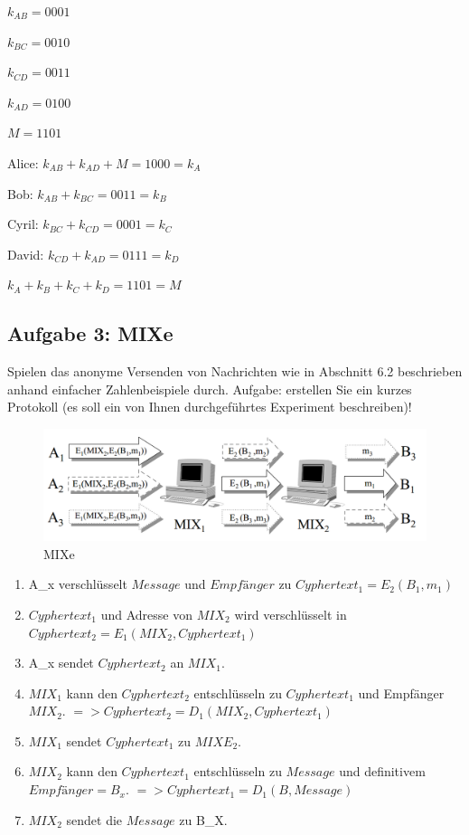\documentclass[11pt]{article}
\makeatletter
\def\maxwidth{\ifdim\Gin@nat@width>\linewidth\linewidth
    \else\Gin@nat@width\fi}
\let\Oldincludegraphics\includegraphics
\renewcommand{\includegraphics}[1]{\Oldincludegraphics[width=.8\maxwidth]{#1}}
\providecommand{\tightlist}{%
      \setlength{\itemsep}{0pt}\setlength{\parskip}{0pt}}
\makeatother
\begin{document}
    \(k_{AB}=0001\)

\(k_{BC}=0010\)

\(k_{CD}=0011\)

\(k_{AD}=0100\)

\(M = 1101\)

Alice: \(k_{AB} + k_{AD} + M = 1000 = k_A\)

Bob: \(k_{AB} + k_{BC} = 0011 = k_B\)

Cyril: \(k_{BC} + k_{CD} = 0001 = k_C\)

David: \(k_{CD} + k_{AD} = 0111 = k_D\)

\(k_A + k_B + k_C + k_D = 1101 = M\)

    \subsection{Aufgabe 3: MIXe}\label{aufgabe-3-mixe}

    Spielen das anonyme Versenden von Nachrichten wie in Abschnitt 6.2
beschrieben anhand einfacher Zahlenbeispiele durch. Aufgabe: erstellen
Sie ein kurzes Protokoll (es soll ein von Ihnen durchgeführtes
Experiment beschreiben)!

    \begin{figure}
\centering
\includegraphics{img/mixe.png}
\caption{MIXe}
\end{figure}

    \begin{enumerate}
\def\labelenumi{\arabic{enumi}.}
\tightlist
\item
  A\_x verschlüsselt \(Message\) und \(Empfänger\) zu
  \(Cyphertext_1=E_2(B_1,m_1)\)
\item
  \(Cyphertext_1\) und Adresse von \(MIX_2\) wird verschlüsselt in
  \(Cyphertext_2=E_1(MIX_2,Cyphertext_1)\)
\item
  A\_x sendet \(Cyphertext_2\) an \(MIX_1\).
\item
  \(MIX_1\) kann den \(Cyphertext_2\) entschlüsseln zu \(Cyphertext_1\)
  und Empfänger \(MIX_2\). \(=> Cyphertext_2=D_1(MIX_2,Cyphertext_1)\)
\item
  \(MIX_1\) sendet \(Cyphertext_1\) zu \(MIXE_2\).
\item
  \(MIX_2\) kann den \(Cyphertext_1\) entschlüsseln zu \(Message\) und
  definitivem \(Empfänger=B_x\). \(=> Cyphertext_1=D_1(B,Message)\)
\item
  \(MIX_2\) sendet die \(Message\) zu B\_X.
\end{enumerate}
\end{document}

